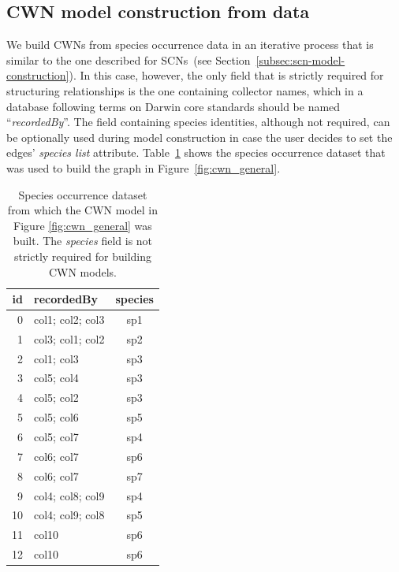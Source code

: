 {%
\subsection{CWN model construction from data} \label{section:cwn_construction_fromdata}

We build CWNs from species occurrence data in an iterative process that is similar to the one described for SCNs~(see Section~\ref{subsec:scn-model-construction}).
In this case, however, the only field that is strictly required for structuring relationships is the one containing collector names, which in a database following terms on Darwin core  standards should be named ``\textit{recordedBy}''.
The field containing species identities, although not required, can be optionally used during model construction in case the user decides to set the edges' \textit{species list} attribute.
Table~\ref{table:cwn_example_dataset} shows the species occurrence dataset that was used to build the graph in Figure~\ref{fig:cwn_general}.

\begin{table}[!ht]
  \caption{Species occurrence dataset from which the CWN model in Figure \ref{fig:cwn_general} was built. The \textit{species} field is not strictly required for building CWN models.}
  \begin{center}
  \begin{tabular}{r l c}
      id & recordedBy & species \\
      \hline
        0 & col1; col2; col3 & sp1\\ 
        1 & col3; col1; col2 & sp2\\ 
        2 & col1; col3 & sp3\\ 
        3 & col5; col4 & sp3\\ 
        4 & col5; col2 & sp3\\ 
        5 & col5; col6 & sp5\\ 
        6 & col5; col7 & sp4\\ 
        7 & col6; col7 & sp6\\ 
        8 & col6; col7 & sp7\\ 
        9 & col4; col8; col9 & sp4\\ 
        10 & col4; col9; col8 & sp5\\ 
        11 & col10 & sp6\\ 
        12 & col10 & sp6\\
       \hline
  \end{tabular}
  \end{center}
  \label{table:cwn_example_dataset}
\end{table}

}
